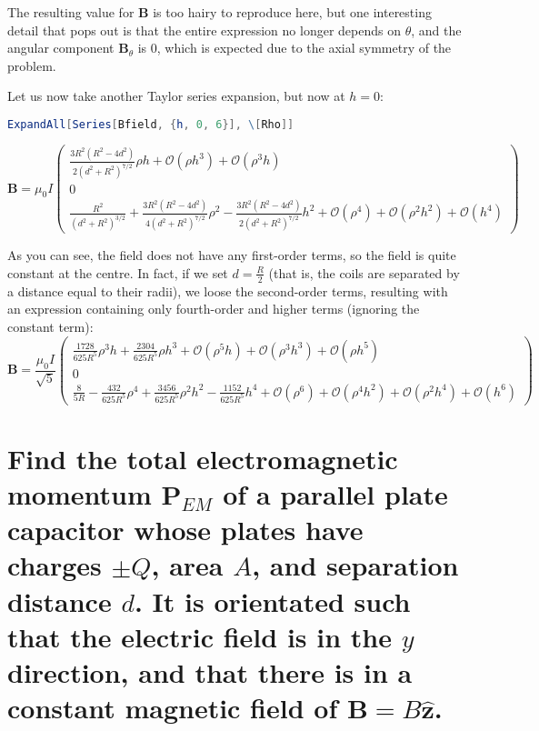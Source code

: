 \documentclass[a4paper]{scrartcl}
\begin{document}
The resulting value for \(\mathbf{B}\) is too hairy to reproduce here, but one interesting detail that pops out is that the entire expression no longer depends on \(\theta\), and the angular component \(\mathbf{B}_{\theta}\) is 0, which is expected due to the axial symmetry of the problem.

Let us now take another Taylor series expansion, but now at \(h = 0\):
\begin{lstlisting}[language = Mathematica, frame = single]
ExpandAll[Series[Bfield, {h, 0, 6}], \[Rho]]
\end{lstlisting}
\[\mathbf{B} = \mu_0 I \begin{pmatrix}
    \frac{3 R^2 \left(R^2 - 4 d^2\right)}{2 \left(d^2 + R^2\right)^{7/2}} \rho h + \mathcal{O}(\rho h^3) + \mathcal{O}(\rho^3 h) \\
    0 \\
    \frac{R^2}{\left(d^2 + R^2\right)^{3/2}} + \frac{3 R^2 \left(R^2 - 4 d^2\right)}{4 \left(d^2 + R^2\right)^{7/2}} \rho^2 - \frac{3 R^2 \left(R^2 - 4 d^2\right)}{2 \left(d^2 + R^2\right)^{7/2}} h^2 + \mathcal{O}(\rho^4) + \mathcal{O}(\rho^2 h^2) + \mathcal{O}(h^4)
\end{pmatrix}\]

As you can see, the field does not have any first-order terms, so the field is quite constant at the centre. In fact, if we set \(d = \frac{R}{2}\) (that is, the coils are separated by a distance equal to their radii), we loose the second-order terms, resulting with an expression containing only fourth-order and higher terms (ignoring the constant term):
\[\mathbf{B} = \frac{\mu_0 I}{\sqrt{5}} \begin{pmatrix}
    \frac{1728}{625 R^5} \rho^3 h + \frac{2304}{625 R^5} \rho h^3 + \mathcal{O}(\rho^5 h) + \mathcal{O}(\rho^3 h^3) + \mathcal{O}(\rho h^5) \\
    0 \\
    \frac{8}{5 R} - \frac{432}{625 R^5} \rho^4 + \frac{3456}{625 R^5} \rho^2 h^2 - \frac{1152}{625 R^5} h^4 + \mathcal{O}(\rho^6) + \mathcal{O}(\rho^4 h^2) + \mathcal{O}(\rho^2 h^4) + \mathcal{O}(h^6)
\end{pmatrix}\]

\section{Find the total electromagnetic momentum \(\mathbf{P}_{EM}\) of a parallel plate capacitor whose plates have charges \(\pm Q\), area \(A\), and separation distance \(d\). It is orientated such that the electric field is in the \(y\) direction, and that there is in a constant magnetic field of \(\mathbf{B} = B \hat{\mathbf{z}}\).}
\end{document}
